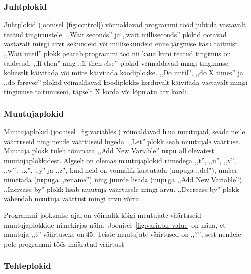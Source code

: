 \documentclass[12pt]{article}
\begin{document}
\subsubsection{Juhtplokid}


Juhtplokid (joonisel~\ref{fig:control}) võimaldavad programmi tööd juhtida vastavalt teatud tingimustele. ,,Wait seconds'' ja ,,wait milliseconds'' plokid ootavad vastavalt mingi arvu sekundeid või millisekundeid enne järgmise käsu täitmist. ,,Wait until'' plokk peatab programmi töö nii kaua kuni teatud tingimus on täidetud. ,,If then'' ning ,,If then else'' plokid võimaldavad mingi tingimuse kohaselt käivitada või mitte käivitada koodiplokke. ,,Do until'', ,,do X times'' ja ,,do forever'' plokid 
võimaldavad koodiplokke korduvalt käivitada vastavalt mingi tingimuse täitumiseni, täpselt X korda või lõpmatu arv kordi.

\subsubsection{Muutujaplokid}


Muutujaplokid (joonisel~\ref{fig:variables}) võimaldavad luua muutujaid, seada neile väärtuseid ning nende väärtuseid lugeda. ,,Let'' plokk seab muutujale väärtuse. Muutuja plokk tuleb tõmmata ,,Add New Variable'' nupu all olevatest muutujaplokkidest. Algselt on olemas muutujaplokid nimedega ,,t'', ,,u'', ,,v'', ,,w'', ,,x'', ,,y'' ja ,,z'', kuid neid on võimalik kustutada (nupuga ,,del''), ümber nimetada (nupuga ,,rename'') ning juurde lisada (nupuga ,,Add New Variable''). ,,Increase by'' plokk 
lisab muutuja väärtusele mingi arvu. ,,Decrease by'' plokk vähendab muutuja väärtust mingi arvu võrra.


Programmi jooksmise ajal on võimalik kõigi muutujate väärtuseid muutujaplokkide nimekirjas näha. Joonisel~\ref{fig:variable-value} on näha, et muutuja ,,t'' väärtuseks on 45. Teiste muutujate väärtused on ,,?'', sest nendele pole programmi töös määratud väärtust.

\subsubsection{Tehteplokid}

\end{document}
